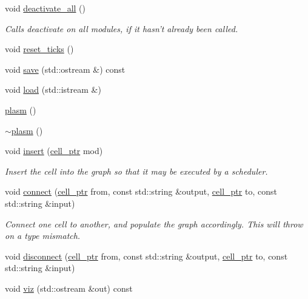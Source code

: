 \begin{DoxyCompactItemize}
void \hyperlink{structecto_1_1plasm_a6c10f2812f731c3787e5e22bdd80e9bc}{deactivate\-\_\-all} ()
\begin{DoxyCompactList}\small\item\em Calls deactivate on all modules, if it hasn't already been called. \end{DoxyCompactList}\item 
void \hyperlink{structecto_1_1plasm_a992f656fa931efc20d2cf1a97c963cec}{reset\-\_\-ticks} ()
\item 
void \hyperlink{structecto_1_1plasm_ab0fd6bec2e5d8943363fe5aa36c1d676}{save} (std\-::ostream \&) const 
\item 
void \hyperlink{structecto_1_1plasm_a854400c2f46f995731e058c72a547185}{load} (std\-::istream \&)
\item 
\hyperlink{structecto_1_1plasm_a1d4a2f7e4fa1a4ef839c7ba0316a825c}{plasm} ()
\item 
\hyperlink{structecto_1_1plasm_a3000d2cb042c0875b4d5c38d33763845}{$\sim$plasm} ()
\item 
void \hyperlink{structecto_1_1plasm_a3419c720b1f839cf9b423655cf4de343}{insert} (\hyperlink{namespaceecto_aed1809e82b9229ea81ef9ee3438cf62c}{cell\-\_\-ptr} mod)
\begin{DoxyCompactList}\small\item\em Insert the cell into the graph so that it may be executed by a scheduler. \end{DoxyCompactList}\item 
void \hyperlink{structecto_1_1plasm_a0ca320f5cef8372cfa713fd7991ad3b2}{connect} (\hyperlink{namespaceecto_aed1809e82b9229ea81ef9ee3438cf62c}{cell\-\_\-ptr} from, const std\-::string \&output, \hyperlink{namespaceecto_aed1809e82b9229ea81ef9ee3438cf62c}{cell\-\_\-ptr} to, const std\-::string \&input)
\begin{DoxyCompactList}\small\item\em Connect one cell to another, and populate the graph accordingly. This will throw on a type mismatch. \end{DoxyCompactList}\item 
void \hyperlink{structecto_1_1plasm_a5e187b40ce0a7d7ed9a6859452aed5ca}{disconnect} (\hyperlink{namespaceecto_aed1809e82b9229ea81ef9ee3438cf62c}{cell\-\_\-ptr} from, const std\-::string \&output, \hyperlink{namespaceecto_aed1809e82b9229ea81ef9ee3438cf62c}{cell\-\_\-ptr} to, const std\-::string \&input)
\item 
void \hyperlink{structecto_1_1plasm_a6350e90b6d85a218e7a84183eaed0c18}{viz} (std\-::ostream \&out) const 

\end{DoxyCompactItemize}
